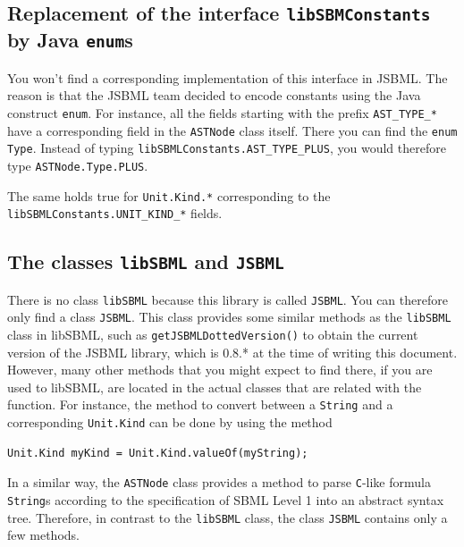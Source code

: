 \documentclass[
  BCOR12mm,
  letterpaper,
  11pt,
  headsepline,
  pointlessnumbers,
  tablecaptionabove,
  onelinecaption,
  headinclude,
  appendixprefix,
  idxtotoc,
  bibtotoc,
  twoside,
  titlepage
]{scrartcl}
\begin{document}
\subsection{Replacement of the interface \texttt{libSBMConstants} by Java \texttt{enum}s}

You won't find a corresponding implementation of this interface in 
JSBML. The reason is that the JSBML team decided to encode constants
using the Java construct \texttt{enum}. For instance, all the fields starting
with the prefix \texttt{AST\_TYPE\_*}
 have a
corresponding field in the \texttt{ASTNode} class itself. There you can find the
\texttt{enum} \texttt{Type}.
Instead of typing \texttt{libSBMLConstants.AST\_TYPE\_PLUS}, you would therefore
type \texttt{ASTNode.Type.PLUS}.

The same holds true for \texttt{Unit.Kind.*} corresponding to the
\texttt{libSBMLConstants.UNIT\_KIND\_*}
 fields.

\subsection{The classes \texttt{libSBML} and \texttt{JSBML}}

There is no class \texttt{libSBML} because this library is called
\texttt{JSBML}. You can
therefore only find a class \texttt{JSBML}. This
class provides some similar methods as the \texttt{libSBML} class in libSBML,
such as \texttt{getJSBMLDottedVersion()}
 to obtain the current
version of the JSBML library, which is 0.8.* at the time of writing this
document. However, many other methods that you might expect
to find there, if you are used to libSBML, are located in the actual classes
that are related with the function. For instance, the method to convert between
a \texttt{String} and
a corresponding \texttt{Unit.Kind} can be done
by using the method
\begin{lstlisting}
Unit.Kind myKind = Unit.Kind.valueOf(myString);
\end{lstlisting}
In a similar way, the \texttt{ASTNode} class provides a method to parse
\texttt{C}-like
formula \texttt{String}s according to the specification of SBML Level 1
\citep{Hucka2003} into an abstract syntax tree. Therefore, in contrast to the
\texttt{libSBML} class, the class \texttt{JSBML} contains only a few methods.
\end{document}
